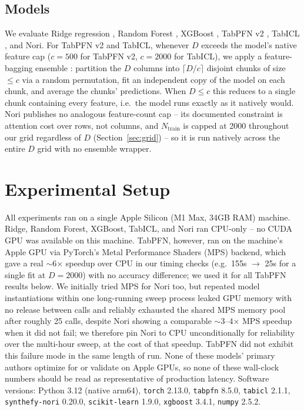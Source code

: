\documentclass{article}
\begin{document}
\subsection{Models}
\label{sec:models}

We evaluate Ridge regression \citep{hoerl1970ridge}, Random Forest
\citep{breiman2001random}, XGBoost \citep{chen2016xgboost}, TabPFN v2
\citep{hollmann2025tabpfn}, TabICL \citep{qu2025tabicl}, and Nori. For TabPFN v2 and
TabICL, whenever $D$ exceeds the model's native feature cap ($c=500$ for TabPFN v2,
$c=2000$ for TabICL), we apply a feature-bagging ensemble \citep{feuer2023scaling}:
partition the $D$ columns into $\lceil D/c \rceil$ disjoint chunks of size $\leq c$ via
a random permutation, fit an independent copy of the model on each chunk, and average
the chunks' predictions. When $D \leq c$ this reduces to a single chunk containing
every feature, i.e.\ the model runs exactly as it natively would. Nori publishes no
analogous feature-count cap -- its documented constraint is attention cost over rows,
not columns, and $N_{\text{train}}$ is capped at 2000 throughout our grid regardless
of $D$ (Section~\ref{sec:grid}) -- so it is run natively across the entire $D$ grid
with no ensemble wrapper.

\section{Experimental Setup}
\label{sec:setup}

All experiments ran on a single Apple Silicon (M1 Max, 34GB RAM) machine. Ridge,
Random Forest, XGBoost, TabICL, and Nori ran CPU-only -- no CUDA GPU was available on
this machine. TabPFN, however, ran on the machine's Apple GPU via PyTorch's Metal
Performance Shaders (MPS) backend, which gave a real $\sim$6$\times$ speedup over CPU
in our timing checks (e.g.\ 155s $\to$ 25s for a single fit at $D{=}2000$) with no
accuracy difference; we used it for all TabPFN results below. We initially tried MPS
for Nori too, but repeated model instantiations within one long-running sweep process
leaked GPU memory with no release between calls and reliably exhausted the shared MPS
memory pool after roughly 25 calls, despite Nori showing a comparable $\sim$3--4$\times$
MPS speedup when it did not fail; we therefore pin Nori to CPU unconditionally for
reliability over the multi-hour sweep, at the cost of that speedup. TabPFN did not
exhibit this failure mode in the same length of run. None of these models' primary
authors optimize for or validate on Apple GPUs, so none of these wall-clock numbers
should be read as representative of production latency. Software versions: Python
3.12 (native arm64), \verb|torch| 2.13.0, \verb|tabpfn| 8.5.0, \verb|tabicl| 2.1.1,
\verb|synthefy-nori| 0.20.0, \verb|scikit-learn| 1.9.0, \verb|xgboost| 3.4.1,
\verb|numpy| 2.5.2.
\end{document}
